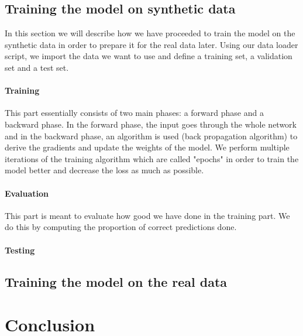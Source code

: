\documentclass[10pt,conference]{IEEEtran}
\begin{document}
\subsection{Training the model on synthetic data}
In this section we will describe how we have proceeded to train the model on the synthetic data in order to prepare it for the real data later. Using our data loader script, we import the data we want to use and define a training set, a validation set and a test set.
\paragraph{Training} This part essentially consists of two main phases: a forward phase and a backward phase. In the forward phase, the input goes through the whole network and in the backward phase, an algorithm is used (back propagation algorithm) to derive the gradients and update the weights of the model. We perform multiple iterations of the training algorithm which are called "epochs" in order to train the model better and decrease the loss as much as possible.
\paragraph{Evaluation} This part is meant to evaluate how good we have done in the training part. We do this by computing the proportion of correct predictions done.
\paragraph{Testing} %

\subsection{Training the model on the real data}

\section{Conclusion}



\end{document}
